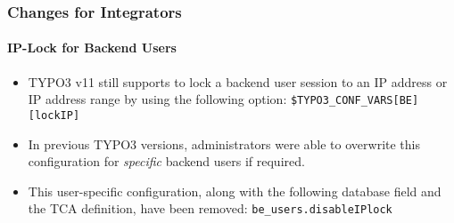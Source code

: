 %

\begin{frame}[fragile]
	\frametitle{Changes for Integrators}
	\framesubtitle{IP-Lock for Backend Users}


	\begin{itemize}
		\item TYPO3 v11 still supports to lock a backend user session to an
			IP address or IP address range by using the following option:\newline
			\smaller\texttt{\$TYPO3\_CONF\_VARS[BE][lockIP]}\normalsize
		\item In previous TYPO3 versions, administrators were able to overwrite
			this configuration for \textit{specific} backend users if required.
		\item This user-specific configuration, along with the following database
			field and the TCA definition, have been removed:\newline
			\smaller\texttt{be\_users.disableIPlock}\normalsize
	\end{itemize}
\end{frame}

